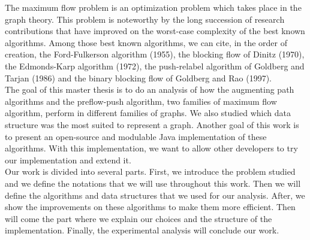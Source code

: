 The maximum flow problem is an optimization problem which takes place in the graph theory. This problem is noteworthy by the long succession of research contributions that have improved on the worst-case complexity of the best known algorithms. Among those best known algorithms, we can cite, in the order of creation, the Ford-Fulkerson algorithm (1955), the blocking flow of Dinitz (1970), the Edmonds-Karp algorithm (1972), the push-relabel algorithm of Goldberg and Tarjan (1986) and the binary blocking flow of Goldberg and Rao (1997). \\

The goal of this master thesis is to do an analysis of how the augmenting path algorithms and the preflow-push algorithm, two families of maximum flow algorithm, perform in different families of graphs. We also studied which data structure was the most suited to represent a graph. Another goal of this work is to present an open-source and modulable Java implementation of these algorithms. With this implementation, we want to allow other developers to try our implementation and extend it. \\


Our work is divided into several parts. First, we introduce the problem studied and we define the notations that we will use throughout this work. Then we will define the algorithms and data structures that we used for our analysis. After, we show the improvements on these algorithms to make them more efficient. Then will come the part where we explain our choices and the structure of the implementation. Finally, the experimental analysis will conclude our work.\\




